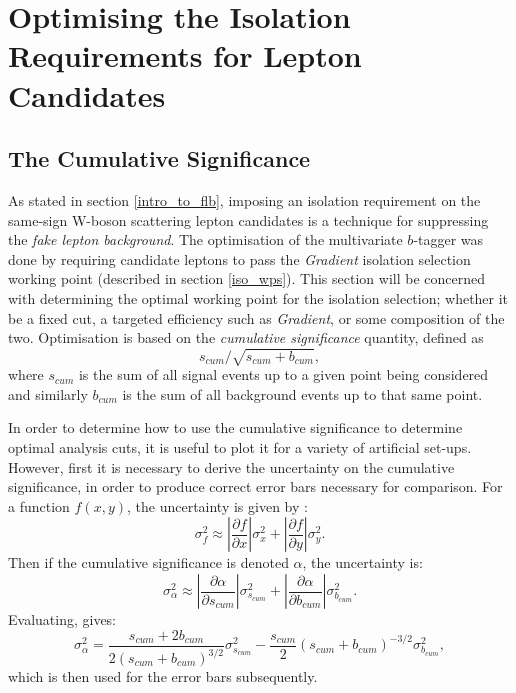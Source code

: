 \section{Optimising the Isolation Requirements for Lepton Candidates}
\subsection{The Cumulative Significance}
\label{description_of_cum_sig}
As stated in section \ref{intro_to_flb}, imposing an isolation requirement on the same-sign W-boson scattering lepton candidates is a technique for suppressing the \emph{fake lepton background}. The optimisation of the multivariate $b$-tagger was done by requiring candidate leptons to pass the \textit{Gradient} isolation selection working point (described in section \ref{iso_wps}). This section will be concerned with determining the optimal working point for the isolation selection; whether it be a fixed cut, a targeted efficiency such as \textit{Gradient}, or some composition of the two. Optimisation is based on the \emph{cumulative significance} quantity, defined as
$$
s_{cum}/\sqrt{s_{cum}+b_{cum}},
$$
where $s_{cum}$ is the sum of all signal events up to a given point being considered and similarly $b_{cum}$ is the sum of all background events up to that same point.

In order to determine how to use the cumulative significance to determine optimal analysis cuts, it is useful to plot it for a variety of artificial set-ups. However, first it is necessary to derive the uncertainty on the cumulative significance, in order to produce correct error bars necessary for comparison. For a function $f(x,y)$, the uncertainty is given by \cite{lyons}:
\begin{equation}
\sigma_{f}^{2} \approx \left| \frac{\partial f}{\partial x} \right| \sigma_{x}^{2} + \left| \frac{\partial f}{\partial y} \right| \sigma_{y}^{2}.
\end{equation}
Then if the cumulative significance is denoted $\alpha$, the uncertainty is:
\begin{equation}
\sigma_{\alpha}^{2} \approx \left| \frac{\partial \alpha}{\partial s_{cum}} \right| \sigma_{s_{cum}}^{2} + \left| \frac{\partial \alpha}{\partial b_{cum}} \right| \sigma_{b_{cum}}^{2}.
\end{equation}
Evaluating, gives:
\begin{equation}
\sigma_{\alpha}^{2} = \frac{s_{cum}+2b_{cum}}{2(s_{cum}+b_{cum})^{3/2}}\sigma_{s_{cum}}^{2} -\frac{s_{cum}}{2}\left( s_{cum} + b_{cum} \right)^{-3/2}\sigma_{b_{cum}}^{2},
\end{equation}
which is then used for the error bars subsequently.

